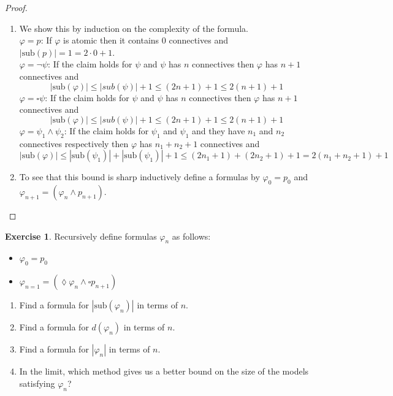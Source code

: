 \documentclass{article}
\newcommand{\vp}{\varphi}
\newcommand{\sub}{\text{sub}}
\theoremstyle{definition}
\newtheorem{exercise}{Exercise}
\begin{document}
\begin{proof} \mbox{} 
    \begin{enumerate}[label = (\alph*)]
        \item We show this by induction on the complexity of the formula. \\ 
        $\vp = p$: If $\vp$ is atomic then it contains 0 connectives and $|\sub(p)|=1=2\cdot 0 + 1$. \\ 
        $\vp = \neg \psi$: If the claim holds for $\psi$ and $\psi$ has $n$ connectives then $\vp$ has $n+1$ connectives and 
        \[ |\sub(\vp)| \le |sub(\psi)| + 1 \le (2n+1) + 1 \le 2(n+1) +1 \] 
        $\vp = \square \psi$: If the claim holds for $\psi$ and $\psi$ has $n$ connectives then $\vp$ has $n+1$ connectives and 
        \[ |\sub(\vp)| \le |sub(\psi)| + 1 \le (2n+1) + 1 \le 2(n+1) +1 \] 
        $\vp = \psi_1 \wedge \psi_2$: If the claim holds for $\psi_1$ and $\psi_1$ and they have $n_1$ and $n_2$ connectives respectively then $\vp$ has $n_1 + n_2 + 1$ connectives and 
        \[ |\sub(\vp)| \le |\sub(\psi_1)| + |\sub(\psi_1)| + 1 \le (2n_1 + 1) + (2n_2 +1) + 1 = 2(n_1 + n_2 + 1) + 1 \] 
        \item To see that this bound is sharp inductively define a formulas by $\vp_0 = p_0$ and $\vp_{n+1} = (\vp_n \wedge p_{n+1})$. 
    \end{enumerate}
\end{proof}

\begin{exercise}
    Recursively define formulas $\vp_n$ as follows: 
    \begin{itemize}
        \item $\vp_0 = p_0$
        \item $\vp_{n=1} = (\lozenge \vp_n \wedge \square p_{n+1})$ 
    \end{itemize}
    \begin{enumerate}[label = (\alph*)]
        \item Find a formula for $|\sub(\vp_n)|$ in terms of $n$. 
        \item Find a formula for $d(\vp_n)$ in terms of $n$. 
        \item Find a formula for $|\vp_n|$ in terms of $n$. 
        \item In the limit, which method gives us a better bound on the size of the models satisfying $\vp_n$? 
    \end{enumerate}
\end{exercise}
\end{document}
